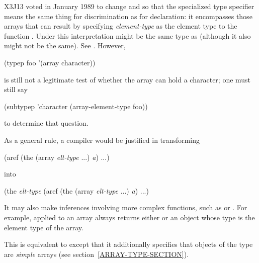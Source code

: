 \begin{flushdesc}
\begin{new}
X3J13 voted in January 1989
to change  and 
so that the specialized  type specifier
means the same thing for discrimination
as for declaration: it encompasses those arrays
that can result by specifying \emph{element-type} as the element type
to the function .
Under this interpretation  might be
the same type as 
(although it also might not be the same).
See .
However,
\begin{lisp}
(typep foo '(array character))
\end{lisp}
is still not a legitimate test of whether the array
 can hold a character; one must still say
\begin{lisp}
(subtypep 'character (array-element-type foo))
\end{lisp}
to determine that question.

As a general rule, a compiler would be justified in transforming
\begin{lisp}
(aref (the (array \emph{elt-type} ...) \emph{a}) ...)
\end{lisp}
into
\begin{lisp}
(the \emph{elt-type} (aref (the (array \emph{elt-type} ...) \emph{a}) ...)
\end{lisp}
It may also make inferences involving more complex functions,
such as  or .
For example,  applied to an array always returns either 
or an object whose type is the element type of the array.
\end{new}


\item[\cd{(simple-array \emph{element-type} \emph{dimensions})}]
This is equivalent
to  except that it additionally
specifies that objects of the type are \emph{simple} arrays
(see section~\ref{ARRAY-TYPE-SECTION}).


\end{flushdesc}
